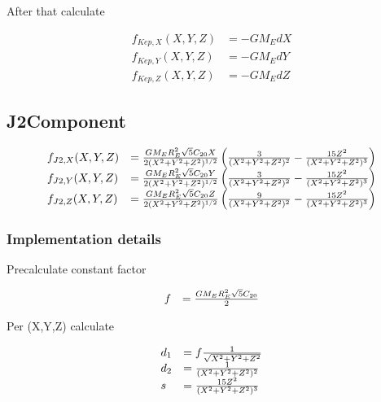 \documentclass{article}
\begin{document}
After that calculate

\begin{equation}
\begin{array}{ll}
f_{Kep,X}(X,Y,Z) &= -GM_EdX\\
f_{Kep,Y}(X,Y,Z) &= -GM_EdY\\
f_{Kep,Z}(X,Y,Z) &= -GM_EdZ
\end{array}
\end{equation}

\subsection{J2Component}

\begin{equation}
\begin{array}{ll}
f_{J2,X}(X,Y,Z) &=
{GM_ER_E^2\sqrt{5}C_{20} X\over 2(X^2+Y^2+Z^2)^{1/2}} \left({3\over(X^2+Y^2+Z^2)^2}-{15Z^2\over(X^2+Y^2+Z^2)^3}\right) \\
f_{J2,Y}(X,Y,Z) &=
{GM_ER_E^2\sqrt{5}C_{20} Y\over 2(X^2+Y^2+Z^2)^{1/2}} \left({3\over(X^2+Y^2+Z^2)^2}-{15Z^2\over(X^2+Y^2+Z^2)^3}\right) \\
f_{J2,Z}(X,Y,Z) &=
{GM_ER_E^2\sqrt{5}C_{20} Z\over 2(X^2+Y^2+Z^2)^{1/2}} \left({9\over(X^2+Y^2+Z^2)^2}-{15Z^2\over(X^2+Y^2+Z^2)^3}\right)
\end{array}
\end{equation}

\subsubsection{Implementation details}

Precalculate constant factor

\begin{equation}
\begin{array}{ll}
f &= {GM_ER_E^2\sqrt{5}C_{20}\over 2}
\end{array}
\end{equation}

Per (X,Y,Z) calculate

\begin{equation}
\begin{array}{ll}
d_1 &= {f{1\over \sqrt{X^2+Y^2+Z^2}}} \\
d_2 &= {1\over (X^2+Y^2+Z^2)^2} \\
s &= {15Z^2\over (X^2+Y^2+Z^2)^3}
\end{array}
\end{equation}
\end{document}
